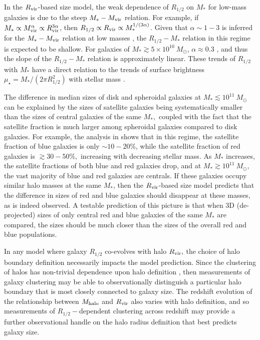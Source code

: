 \documentclass[usenatbib,usegraphicx,letterpaper]{mn2e}
\newcommand{\rhalf}{R_{1/2}}
\newcommand{\mstar}{M_{\ast}}
\newcommand{\mvir}{M_{\rm vir}}
\newcommand{\mhalo}{M_{\rm halo}}
\newcommand{\rvir}{R_{\rm vir}}
\begin{document}
In the $\rvir$-based size model, the weak dependence of $\rhalf$ on $\mstar$ for low-mass galaxies is due to the steep $\mstar-\mvir$ relation. For example, if $\mstar\propto\mvir^\alpha\propto\rvir^{3\alpha}$, then $\rhalf\propto \rvir\propto \mstar^{1/(3\alpha)}$. Given that $\alpha\sim 1-3$ is inferred for the $\mstar-\mvir$ relation at low masses \citep{kravtsov10,moster_etal13,behroozi13_smhm,kravtsov_etal14}, the $\rhalf-\mstar$ relation in this regime is expected to be shallow.
For galaxies of $\mstar\gtrsim 5\times 10^{10}\ M_\odot$, $\alpha\approx 0.3$ \citep[e.g.,][]{kravtsov_etal14}, and thus
the slope of the $\rhalf-\mstar$ relation is approximately linear. These trends of $\rhalf$ with $\mstar$ have a direct relation to the trends of surface brightness $\mu_\star=\mstar/(2\pi\rhalf^2)$ with stellar mass \citep[see, for example, the $\mu_\star-$dependent clustering measurements in][which are qualitatively similar to the measurements reported here]{li_etal06}.

The difference in median sizes of disk and spheroidal galaxies at $\mstar\lesssim 10^{11}\ M_\odot$ can be explained by the sizes of satellite galaxies being systematically smaller than the sizes of central galaxies of the same $\mstar,$ coupled with the fact that the satellite fraction is much larger among spheroidal galaxies compared to disk galaxies. For example, the analysis in \citet{rodriguez_puebla_etal15} shows that in this regime, the satellite fraction of blue galaxies is only $\sim10-20\%$, while
the satellite fraction of red galaxies is $\gtrsim 30-50\%,$ increasing with decreasing stellar mass.
As $\mstar$ increases, the satellite fractions of both blue and red galaxies drop, and at $\mstar\gtrsim 10^{11}\ M_\odot,$ the vast majority of blue and red galaxies are centrals. If these galaxies occupy similar halo masses at the same $\mstar$, then the $\rvir$-based size model predicts that the difference in sizes of red and blue galaxies should disappear at these masses, as is indeed observed. A testable prediction of this picture is that when 3D (de-projected) sizes of only central red and blue galaxies of the same $\mstar$ are compared, the sizes should be much closer than the sizes of the overall red and blue populations.

In any model where galaxy $\rhalf$ co-evolves with halo $\rvir,$ the choice of halo boundary definition necessarily impacts the model prediction. Since the clustering of halos has non-trivial dependence upon halo definition \citep{villarreal_etal17}, then measurements of galaxy clustering may be able to observationally distinguish a particular halo boundary that is most closely connected to galaxy size. The redshift evolution of the relationship between $\mhalo$ and $\rvir$ also varies with halo definition, and so measurements of $\rhalf-$dependent clustering across redshift may provide a further observational handle on the halo radius definition that best predicts galaxy size. 
\end{document}
